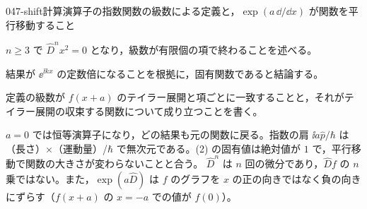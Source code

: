 \documentclass[uplatex,dvipdfmx,a4paper,11pt]{jsarticle}
\begin{document}
\begin{mondai}{047-shift}{計算}{演算子の指数関数の級数による定義と，$\exp(a\,\dd/\dd x)$ が関数を平行移動すること}
\begin{tadashii}
\begin{ronten}
  \item {} $n\ge 3$ で $\hat{D}^{n}x^{2}=0$ となり，級数が有限個の項で終わることを述べる。
  \item {} 結果が $\ee^{\ii kx}$ の定数倍になることを根拠に，固有関数であると結論する。
  \item {} 定義の級数が $f(x+a)$ のテイラー展開と項ごとに一致することと，それがテイラー展開の収束する関数について成り立つことを書く。
\end{ronten}
\kenzan $a=0$ では恒等演算子になり，どの結果も元の関数に戻る。指数の肩 $\ii a\hat{p}/\hbar$ は（長さ）×（運動量）/$\hbar$ で無次元である。(2) の固有値は絶対値が $1$ で，平行移動で関数の大きさが変わらないことと合う。
\tsumazuki $\hat{D}^{n}$ は $n$ 回の微分であり，$\hat{D}f$ の $n$ 乗ではない。また，$\exp(a\hat{D})$ は $f$ のグラフを $x$ の正の向きではなく負の向きにずらす（$f(x+a)$ の $x=-a$ での値が $f(0)$）。
\end{tadashii}
\end{mondai}
\end{document}
